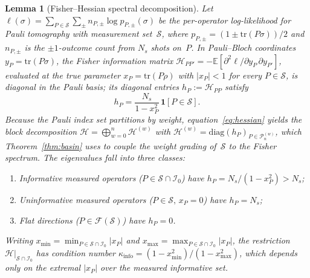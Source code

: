 \documentclass[twocolumn,prx,aps,superscriptaddress,longbibliography,floatfix]{revtex4-2}
\newtheorem{lemma}[theorem]{Lemma}
\newcommand{\pclaim}[4]{}
\begin{document}
\pclaim{env:lem:hessian}{proved}{*}{lem:hessian}%
\begin{lemma}[Fisher--Hessian spectral decomposition]
\label{lem:hessian}
Let $\ell(\sigma) = \sum_{P \in \mathcal{S}} \sum_{\pm} n_{P,\pm}
\log p_{P,\pm}(\sigma)$ be the per-operator log-likelihood for
Pauli tomography with measurement set~$\mathcal{S}$, where
$p_{P,\pm} = (1 \pm \mathrm{tr}(P\sigma))/2$ and $n_{P,\pm}$ is
the $\pm 1$-outcome count from $N_s$ shots on~$P$.
In Pauli--Bloch coordinates $y_P = \mathrm{tr}(P\sigma)$, the
Fisher information matrix
$\mathcal{H}_{PP'} = -\mathbb{E}[\partial^2\ell/\partial y_P\,\partial y_{P'}]$,
evaluated at the true parameter $x_P = \mathrm{tr}(P\rho)$ with
$|x_P| < 1$ for every $P \in \mathcal{S}$, is diagonal in the
Pauli basis; its diagonal entries $h_P := \mathcal{H}_{PP}$ satisfy
\begin{equation}\label{eq:hessian}
  h_P = \frac{N_s}{1 - x_P^2}\,\mathbf{1}[P \in \mathcal{S}].
\end{equation}
Because the Pauli index set partitions by weight, equation~\eqref{eq:hessian}
yields the block decomposition
$\mathcal{H} = \bigoplus_{w=0}^{n} \mathcal{H}^{(w)}$ with
$\mathcal{H}^{(w)} = \mathrm{diag}(h_P)_{P \in \mathcal{P}_n^{(w)}}$,
which Theorem~\ref{thm:basin} uses to couple the weight grading
of~$\mathcal{S}$ to the Fisher spectrum.
The eigenvalues fall into three classes:
\begin{enumerate}
\item Informative measured operators ($P \in \mathcal{S} \cap \mathcal{I}_0$)
  have $h_P = N_s/(1 - x_P^2) > N_s$;
\item Uninformative measured operators ($P \in \mathcal{S},\, x_P = 0$)
  have $h_P = N_s$;
\item Flat directions ($P \in \mathcal{F}(\mathcal{S})$) have $h_P = 0$.
\end{enumerate}
Writing $x_{\min} = \min_{P \in \mathcal{S} \cap \mathcal{I}_0}|x_P|$ and
$x_{\max} = \max_{P \in \mathcal{S} \cap \mathcal{I}_0}|x_P|$, the restriction
$\mathcal{H}\big|_{\mathcal{S} \cap \mathcal{I}_0}$ has condition number
$\kappa_{\mathrm{info}} = (1 - x_{\min}^2)/(1 - x_{\max}^2)$,
which depends only on the extremal $|x_P|$ over the measured informative set.
\end{lemma}
\end{document}
